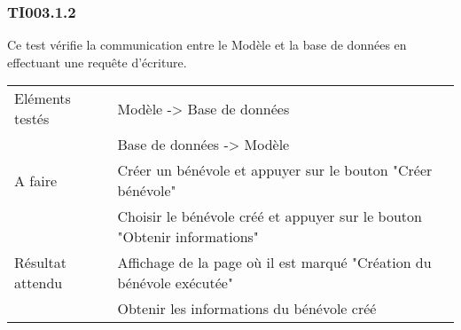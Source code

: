 
  	\subsubsection{TI003.1.2}
  		Ce test vérifie la communication entre le Modèle et la base de données en effectuant une requête d'écriture.
  		\begin{center}
    	 		\begin{tabular}[h]{|p{}|p{}|}
			\hline
				Eléments testés & Modèle -> Base de données  \\
							    &  Base de données -> Modèle \\\hline
    				A faire & Créer un bénévole et appuyer sur le bouton "Créer bénévole" \\
    						& Choisir le bénévole créé et appuyer sur le bouton "Obtenir informations" \\\hline
    				Résultat attendu & Affichage de la page où il est marqué "Création du bénévole exécutée" \\
    								 & Obtenir les informations du bénévole créé \\\hline
     		\end{tabular}
  		\end{center}	